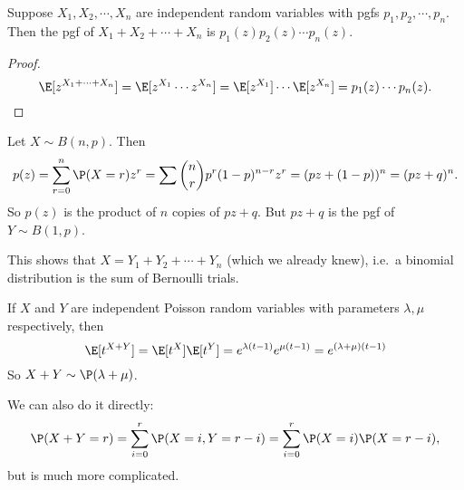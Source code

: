 \documentclass[a4paper]{article}
\begin{document}
\begin{thm}
  Suppose $X_1, X_2, \cdots, X_n$ are independent random variables with pgfs $p_1, p_2, \cdots, p_n$. Then the pgf of $X_1 + X_2 + \cdots + X_n$ is $p_1(z)p_2(z)\cdots p_n(z)$.
\end{thm}

\begin{proof}
  \[
    \E[z^{X_1 + \cdots + X_n}] = \E[z^{X_1}\cdots z^{X_n}] = \E[z^{X_1}]\cdots\E[z^{X_n}] = p_1(z)\cdots p_n(z).\qedhere
  \]
\end{proof}

\begin{eg}
  Let $X\sim B(n, p)$. Then
  \[
    p(z) = \sum_{r = 0}^{n} \P(X = r)z^r = \sum \binom{n}{r} p^r(1 - p)^{n - r}z^r = (pz + (1 - p))^n = (pz + q)^n.
  \]
  So $p(z)$ is the product of $n$ copies of $pz + q$. But $pz + q$ is the pgf of $Y\sim B(1, p)$.

  This shows that $X = Y_1 + Y_2 + \cdots + Y_n$ (which we already knew), i.e.\ a binomial distribution is the sum of Bernoulli trials.
\end{eg}

\begin{eg}
  If $X$ and $Y$ are independent Poisson random variables with parameters $\lambda, \mu$ respectively, then
  \[
    \E[t^{X + Y}] = \E[t^X]\E[t^Y] = e^{\lambda(t - 1)}e^{\mu(t - 1)} = e^{(\lambda + \mu)(t - 1)}
  \]
  So $X + Y\sim \P(\lambda + \mu)$.

  We can also do it directly:
  \[
    \P(X + Y = r) = \sum_{i = 0}^r \P(X = i, Y = r - i) = \sum_{i = 0}^r \P(X = i)\P(X = r - i),
  \]
  but is much more complicated.
\end{eg}
\end{document}
